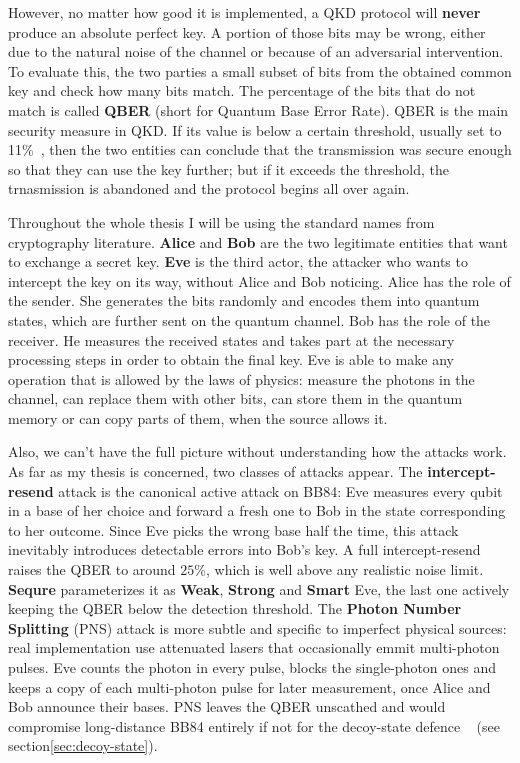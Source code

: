 \documentclass[12pt, a4paper]{article}
\begin{document}
However, no matter how good it is implemented, a QKD protocol will \textbf{never} produce an absolute perfect key. A portion of those bits may be wrong, either due to the natural noise of the channel or because of an adversarial intervention. To evaluate this, the two parties a small subset of bits from the obtained common key and check how many bits match. The percentage of the bits that do not match is called \textbf{QBER} (short for Quantum Base Error Rate). QBER is the main security measure in QKD. If its value is below a certain threshold, usually set to 11\%~\cite{shorPreskill2000}, then the two entities can conclude that the transmission was secure enough so that they can use the key further; but if it exceeds the threshold, the trnasmission is abandoned and the protocol begins all over again.

Throughout the whole thesis I will be using the standard names from cryptography literature. \textbf{Alice} and \textbf{Bob} are the two legitimate entities that want to exchange a secret key. \textbf{Eve} is the third actor, the attacker who wants to intercept the key on its way, without Alice and Bob noticing. Alice has the role of the sender. She generates the bits randomly and encodes them into quantum states, which are further sent on the quantum channel. Bob has the role of the receiver. He measures the received states and takes part at the necessary processing steps in order to obtain the final key. Eve is able to make any operation that is allowed by the laws of physics: measure the photons in the channel, can replace them with other bits, can store them in the quantum memory or can copy parts of them, when the source allows it. 

Also, we can't have the full picture without understanding how the attacks work. As far as my thesis is concerned, two classes of attacks appear.
The \textbf{intercept-resend} attack is the canonical active attack on BB84: Eve measures every qubit in a base of her choice and forward a fresh one to Bob in the state corresponding to her outcome. Since Eve picks the wrong base half the time, this attack inevitably introduces detectable errors into Bob's key. A full intercept-resend raises the QBER to around $25\%$, which is well above any realistic noise limit.
\textbf{Sequre} parameterizes it as \textbf{Weak}, \textbf{Strong} and \textbf{Smart} Eve, the last one actively keeping the QBER below the detection threshold.
The \textbf{Photon Number Splitting} (PNS) attack is more subtle and specific to imperfect physical sources: real implementation use attenuated lasers that occasionally emmit multi-photon pulses. Eve counts the photon in every pulse, blocks the single-photon ones and keeps a copy of each multi-photon pulse for later measurement, once Alice and Bob announce their bases. PNS leaves the QBER unscathed and would compromise long-distance BB84 entirely if not for the decoy-state defence ~\cite{lo2005decoy,wang2005decoy} (see section\ref{sec:decoy-state}). 
\end{document}
